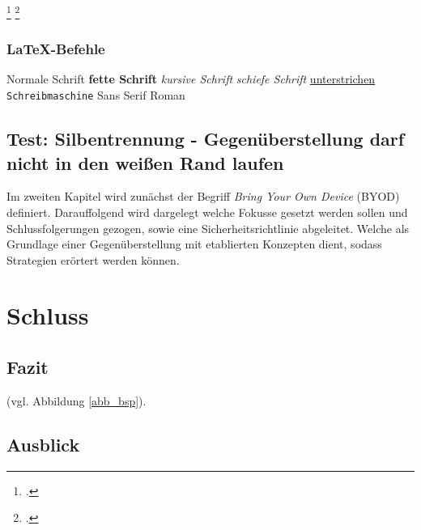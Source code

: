 \Blindtext\footcite[][34]{Digitaloekonomie}
\blinditemize
\blindtext\footcite[][511]{Tanenbaum2016}

\subsubsection{LaTeX-Befehle}
    \textnormal{Normale Schrift} 
    \textbullet\addspace \textbf{fette Schrift} 
    \textbullet\addspace \textit{kursive Schrift} 
    \textbullet\addspace \textsl{schiefe Schrift} 
    \textbullet\addspace \underline{unterstrichen} 
    \textbullet\addspace \texttt{Schreib\-ma\-schi\-ne} 
    \textbullet\addspace \textsf{Sans Serif} 
    \textbullet\addspace \textrm{Roman} 

\subsection{Test: Silbentrennung - Gegenüberstellung darf nicht in den weißen Rand laufen}
Im zweiten Kapitel wird zunächst der Begriff \textit{Bring Your Own Device} (BYOD) definiert. Darauffolgend wird dargelegt welche Fokusse gesetzt werden sollen und Schlussfolgerungen gezogen, sowie eine Sicherheitsrichtlinie abgeleitet. Welche als Grundlage einer Gegenüberstellung mit etablierten Konzepten dient, sodass Strategien erörtert werden können. 

\section{Schluss}
\subsection{Fazit}
\blindtext (vgl. Abbildung \ref{abb_bsp}).

\subsection{Ausblick}
\blindtext
